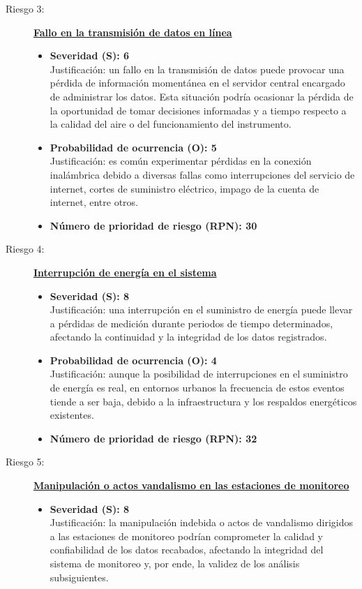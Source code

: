 \begin{description}
	
	\item[Riesgo 3:] \textbf{\underline{Fallo en la transmisión de datos en línea}}
	\begin{itemize}
		\item \textbf{Severidad (S): 6} \\
		Justificación: un fallo en la transmisión de datos puede provocar una pérdida de información momentánea en el servidor central encargado de administrar los datos. Esta situación podría ocasionar la pérdida de la oportunidad de tomar decisiones informadas y a tiempo respecto a la calidad del aire o del funcionamiento del instrumento.
		
		\item \textbf{Probabilidad de ocurrencia (O): 5} \\
		Justificación: es común experimentar pérdidas en la conexión inalámbrica debido a diversas fallas como interrupciones del servicio de internet, cortes de suministro eléctrico, impago de la cuenta de internet, entre otros. 
		 
		\item \textbf{Número de prioridad de riesgo (RPN): 30} \\
	\end{itemize}

	
	\item[Riesgo 4:] \underline{\textbf{Interrupción de energía en el sistema}}
	\begin{itemize}
		\item \textbf{Severidad (S): 8} \\
		Justificación: una interrupción en el suministro de energía puede llevar a pérdidas de medición durante periodos de tiempo determinados, afectando la continuidad y la integridad de los datos registrados.
		
		\item \textbf{Probabilidad de ocurrencia (O): 4} \\
		Justificación: aunque la posibilidad de interrupciones en el suministro de energía es real, en entornos urbanos la frecuencia de estos eventos tiende a ser baja, debido a la infraestructura y los respaldos energéticos existentes.
		
		\item \textbf{Número de prioridad de riesgo (RPN): 32} \\

	\end{itemize}

	
	\item[Riesgo 5:] \underline{\textbf{Manipulación o actos vandalismo en las estaciones de monitoreo}}
	\begin{itemize}
		\item \textbf{Severidad (S): 8} \\
		Justificación: la manipulación indebida o actos de vandalismo dirigidos a las estaciones de monitoreo podrían comprometer la calidad y confiabilidad de los datos recabados, afectando la integridad del sistema de monitoreo y, por ende, la validez de los análisis subsiguientes.
		

\end{itemize}
\end{description}
